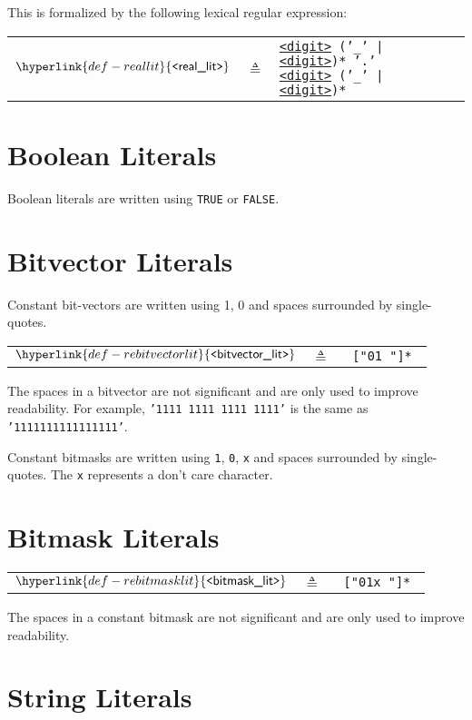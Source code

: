 \documentclass{book}
\newcommand\Char[1]{\fbox{#1}}
\newcommand\Underscore[0]{'\_'}
\newcommand\REdigit[0]{\hyperlink{def-redigit}{\texttt{<}\textsf{digit}\texttt{>}}}
\newcommand\REreallit[0]{\hyperlink{def-reallit}{\texttt{<}\textsf{real\_lit}\texttt{>}}}
\newcommand\REbitvectorlit[0]{\hyperlink{def-rebitvectorlit}{\texttt{<}\textsf{bitvector\_lit}\texttt{>}}}
\newcommand\REbitmasklit[0]{\hyperlink{def-rebitmasklit}{\texttt{<}\textsf{bitmask\_lit}\texttt{>}}}
\begin{document}
\hypertarget{def-reallit}{}
This is formalized by the following lexical regular expression:
\begin{center}
\begin{tabular}{rcl}
$\REreallit$ &$\triangleq$& \texttt{\REdigit\ (\Underscore\ | \REdigit)* '.' \REdigit\ (\Underscore\ | \REdigit)*}
\end{tabular}
\end{center}

\section{Boolean Literals}
Boolean literals are written using \texttt{TRUE} or \texttt{FALSE}.

\section{Bitvector Literals}
Constant bit-vectors are written using 1, 0 and spaces surrounded by single-quotes.
\hypertarget{def-rebitvectorlit}{}
\begin{center}
\begin{tabular}{rcl}
$\REbitvectorlit$ &$\triangleq$& \texttt{\Char{'} ["01 "]* \Char{'}}
\end{tabular}
\end{center}

The spaces in a bitvector are not significant and are only used to improve readability.
For example, \texttt{'1111 1111 1111 1111'} is the same as \texttt{'1111111111111111'}.

Constant bitmasks are written using \texttt{1}, \texttt{0}, \texttt{x} and spaces surrounded by single-quotes.
The \texttt{x} represents a don’t care character.

\section{Bitmask Literals}

\hypertarget{def-rebitmasklit}{}
\begin{center}
\begin{tabular}{rcl}
$\REbitmasklit$ &$\triangleq$& \texttt{\Char{'} ["01x "]* \Char{'}}
\end{tabular}
\end{center}

The spaces in a constant bitmask are not significant and are only used to improve readability.

\section{String Literals}
\end{document}
